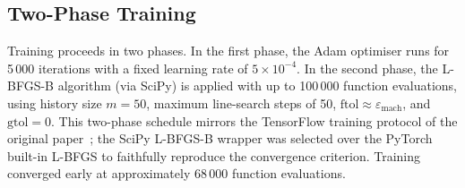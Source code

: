 \subsection{Two-Phase Training}

Training proceeds in two phases.  In the first phase, the Adam
optimiser runs for 5\,000 iterations with a fixed learning rate of
$5\times10^{-4}$.  In the second phase, the L-BFGS-B algorithm (via
SciPy) is applied with up to 100\,000 function evaluations, using
history size $m=50$, maximum line-search steps of 50,
$\text{ftol}\approx\varepsilon_\text{mach}$, and $\text{gtol}=0$.
This two-phase schedule mirrors the TensorFlow training protocol of the
original paper~\cite{rao2020pinnflow}; the SciPy L-BFGS-B wrapper was
selected over the PyTorch built-in L-BFGS to faithfully reproduce the
convergence criterion.  Training converged early at approximately
68\,000 function evaluations.
